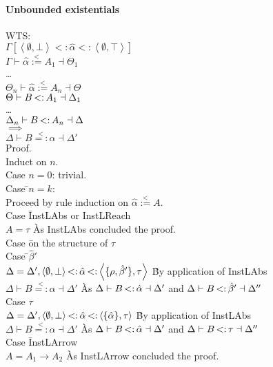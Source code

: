 \documentclass{article}
\newcommand{\st}{\ensuremath{\hspace{-1px}<:\hspace{-1px}}}
\newcommand{\alphahat}{\hat{\alpha}}
\newcommand{\betahat}{\hat{\beta}}
\newcommand{\instr}{\overset{<}{=:}}
\newcommand{\instl}{\overset{<}{:=}}
\newcommand{\tst}{{\scriptstyle{<:}}}
\newcommand{\bound}[3]{#1 \tst #2 \tst #3}
\newcommand{\pair}[2]{\left<#1,#2\right>}
\begin{document}
\paragraph{Unbounded existentials}
\begin{tabbing}
WTS:\=\\
\>$\Gamma[\bound{\pair{\emptyset}{\bot}}{\alphahat}{\pair{\emptyset}{\top}}]$\\
\>$\Gamma \vdash \alphahat \instl A_1 \dashv \Theta_1$\\
\>\ldots\\
\>$\Theta_n \vdash \alphahat \instl A_n \dashv \Theta$\\
\>$\Theta \vdash B \st A_1 \dashv \Delta_1$\\
\>\ldots\\
\>$\Delta_n \vdash B \st A_n \dashv \Delta$\\
$\implies$\\
\>$\Delta \vdash B \instr \alphahat \dashv \Delta'$\\
Proof.\\
Induct on $n$.\\
Case $n=0$: trivial.\\
Case \=$n=k$:\\
\>Proceed by rule induction on $\alphahat \instl A$.\\
\>Case \=InstLAbs or InstLReach\\
\>\>$A = \tau$ \` As InstLAbs concluded the proof.\\
\>\>Case \=on the structure of $\tau$\\
\>\>\> Case \=$\betahat'$\\
\>\>\>\>$\Delta=\Delta',\pair{\emptyset}{\bot} \st \alphahat \st \pair{\{\rho,\betahat'\}}{\tau}$ \` By application of InstLAbs\\
\>\>\>\>$\Delta \vdash B \instr \alphahat \dashv \Delta'$ \` As $\Delta \vdash B \st \alphahat \dashv \Delta'$ and $\Delta \vdash B \st \betahat' \dashv \Delta''$\\
\>\>\> Case $\tau$\\
\>\>\>\> $\Delta=\Delta',\pair{\emptyset}{\bot} \st \alphahat \st \pair{\{\alphahat\}}{\tau}$ \` By application of InstLAbs\\
\>\>\>\>$\Delta \vdash B \instr \alphahat \dashv \Delta'$ \` As $\Delta \vdash B \st \alphahat \dashv \Delta'$ and $\Delta \vdash B \st \tau \dashv \Delta''$\\
 Case \=InstLArrow\\
\>\>$A = A_1 \rightarrow A_2$ \` As InstLArrow concluded the proof.\\

\end{tabbing}
\end{document}
